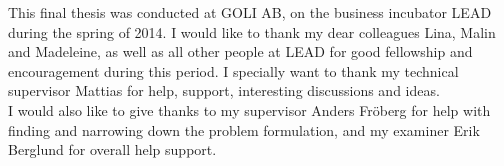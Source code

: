 This final thesis was conducted at GOLI AB, on the business incubator
LEAD during the spring of 2014. I would like to thank my dear colleagues
Lina, Malin and Madeleine, as well as all other people at LEAD for good
fellowship and encouragement during this period. I specially want to
thank my technical supervisor Mattias for help, support, interesting
discussions and ideas.\\

I would also like to give thanks to my supervisor Anders Fröberg for
help with finding and narrowing down the problem formulation, and my
examiner Erik Berglund for overall help support.\\
